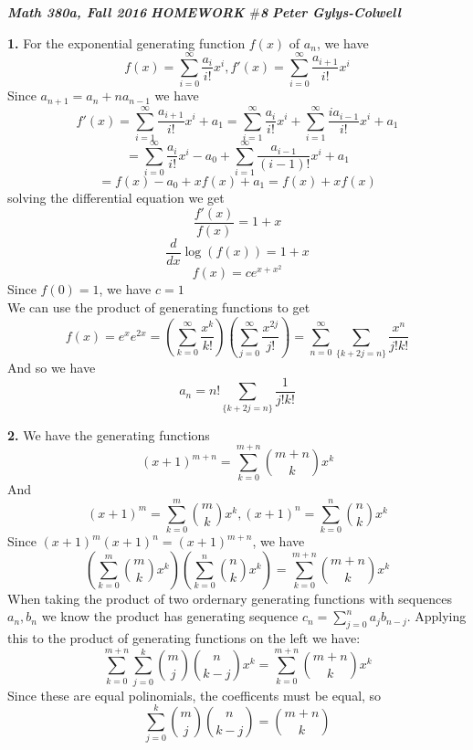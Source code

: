 \documentclass[12pt]{article}
\newenvironment{ques}{\vspace{2 ex}}{\vspace{2 ex}}
\theoremstyle{definition}
\begin{document}
\noindent \textit{\textbf{Math 380a, Fall 2016}} \hspace{1.3cm}
\textit{\textbf{HOMEWORK $\#$8}} \hspace{1.3cm} \textit{\textbf{Peter
Gylys-Colwell}} 

\vspace{1cm}

\begin{ques}
	\textbf{1.} 
		For the exponential generating function $f(x)$ of $a_n$, we
		have
		$$f(x) = \sum_{i = 0}^{\infty} \frac{a_i}{i!} x^i, f'(x) =
		\sum_{i = 0}^{\infty} \frac{a_{i+ 1}}{i!} x^i$$
		Since $a_{n+1} = a_{n} + na_{n-1}$ we have
		$$f'(x) = \sum_{i = 1}^{\infty} \frac{a_{i+ 1}}{i!} x^i + a_1 =
		\sum_{i = 1}^{\infty} \frac{a_{i}}{i!} x^i +\sum_{i =
		1}^{\infty} \frac{ia_{i - 1}}{i!} x^i + a_1$$
		$$ = \sum_{i = 0}^{\infty} \frac{a_{i}}{i!} x^i - a_0 +\sum_{i =
		1}^{\infty} \frac{a_{i - 1}}{(i - 1)!} x^i + a_1$$
		$$= f(x) - a_0 + xf(x) + a_1 = f(x) + xf(x)$$
		solving the differential equation we get
		$$\frac{f'(x)}{f(x)} = 1 + x$$
		$$\frac{d}{dx}\log(f(x)) = 1 + x$$
		$$f(x) = ce^{x + x^2}$$
		Since $f(0) = 1$, we have $c = 1$\\
		We can use the product of generating functions to get
		$$f(x) = e^{x}e^{2x} = \left(\sum_{k=0}^\infty \frac{x^k}{k!}
		\right)\left(\sum_{j=0}^\infty \frac{x^{2j}}{j!} \right) =
		\sum_{n=0}^\infty\sum_{\{k + 2j = n\}} \frac{x^n}{j!k!}$$
		And so we have
		$$a_n = n!\sum_{\{k + 2j = n\}} \frac{1}{j!k!}$$

\end{ques}

\begin{ques}
	\textbf{2.} 
		We have the generating functions 
		$$(x + 1)^{m+n} = \sum_{k = 0}^{m+n}\binom{m+n}{k}x^k$$
		And
		$$(x + 1)^m = \sum_{k = 0}^{m} \binom{m}{k}x^k, (x +
		1)^n = \sum_{k = 0}^{n} \binom{n}{k}x^k$$
		Since $(x+1)^m(x+1)^n = (x + 1)^{m+n}$, we have
		$$\left(\sum_{k = 0}^{m} \binom{m}{k}x^k\right)
		\left(\sum_{k = 0}^{n} \binom{n}{k}x^k\right) = \sum_{k
		= 0}^{m+n}\binom{m+n}{k}x^k$$
		When taking the product of two ordernary generating
		functions with sequences $a_n, b_n$ we know the product
		has generating sequence $c_n = \sum_{j = 0}^n
		a_jb_{n-j}$. Applying this to the product of generating
		functions on the left we have:
		$$\sum_{k=0}^{m+n}\sum_{j=0}^k
		\binom{m}{j}\binom{n}{k-j}x^k = \sum_{k =
		0}^{m+n}\binom{m+n}{k}x^k$$
		Since these are equal polinomials, the coefficents must
		be equal, so
		$$\sum_{j=0}^k \binom{m}{j}\binom{n}{k-j} =
		\binom{m+n}{k}$$

\end{ques}
\end{document}
